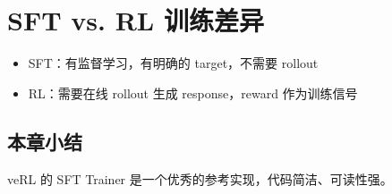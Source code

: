 \section{SFT vs. RL 训练差异}
\begin{itemize}
  \item SFT：有监督学习，有明确的 target，不需要 rollout
  \item RL：需要在线 rollout 生成 response，reward 作为训练信号
\end{itemize}

\subsection{本章小结}
veRL 的 SFT Trainer 是一个优秀的参考实现，代码简洁、可读性强。

\newpage
